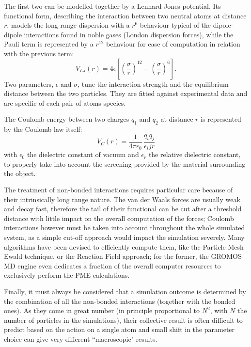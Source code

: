 The first two can be modelled together by a Lennard-Jones potential. Its functional form, describing the interaction between two neutral atoms at distance $r$, models the long range dispersion with a $r^6$ behaviour typical of the dipole-dipole interactions found in noble gases (London dispersion forces), while the Pauli term is represented by a $r^{12}$ behaviour for ease of computation in relation with the previous term:
\begin{equation}
V_{LJ}(r) = 4 \epsilon \left[ \left( \frac{\sigma}{r} \right)^{12} - \left( \frac{\sigma}{r} \right)^6 \right].
\end{equation}
Two parameters, $\epsilon$ and $\sigma$, tune the interaction strength and the equilibrium distance between the two particles. They are fitted against experimental data and are specific of each pair of atoms species.

The Coulomb energy between two charges $q_1$ and $q_2$ at distance $r$ is represented by the Coulomb law itself:
\begin{equation}
V_C(r) = \frac{1}{4 \pi \epsilon_0} \, \frac{q_i q_j}{\epsilon_ij r}
\end{equation}
with $\epsilon_0$ the dielectric constant of vacuum and $\epsilon_r$ the relative dielectric constant, to properly take into account the screening provided by the material surrounding the object.

The treatment of non-bonded interactions requires particular care because of their intrinsically long range nature. The van der Waals forces are usually weak and decay fast, therefore the tail of their functional can be cut after a threshold distance with little impact on the overall computation of the forces; Coulomb interactions however must be taken into account throughout the whole simulated system, as a simple cut-off approach would impact the simulation severely. Many algorithms have been devised to efficiently compute them, like the Particle Mesh Ewald \cite{--} technique, or the Reaction Field \cite{--} approach; for the former, the GROMOS MD engine even dedicates a fraction of the overall computer resources to exclusively perform the PME calculations.

Finally, it must always be considered that a simulation outcome is determined by the combination of all the non-bonded interactions (together with the bonded ones). As they come in great number (in principle proportional to $N^2$, with $N$ the number of particles in the simulations), their collective result is often difficult to predict based on the action on a single atom and small shift in the parameter choice can give very different ``macroscopic" results.

